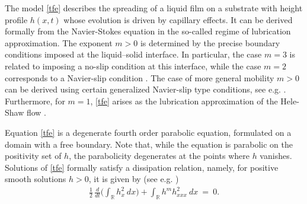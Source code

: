 \documentclass{article}%
\newcommand{\R}{\mathbb{R}}
\newcommand{\ddt}{\, \frac{d}{dt}}
\begin{document}
The model \eqref{tfe} describes the spreading of a liquid film on a substrate with height profile $h(x,t)$ whose
evolution is driven by capillary effects. It can be derived formally from the Navier-Stokes equation in the so-called
regime of lubrication approximation. The exponent $m > 0$ is determined by the precise boundary conditions imposed at
the liquid--solid interface. In particular, the case $m = 3$ is related to imposing a no-slip condition at this interface, while the case $m=2$ corresponds to a Navier-slip condition \cite{Greenspan-1978,Reynolds-1886}. The
case of more general mobility $m > 0$ can be derived using certain generalized Navier-slip type conditions, see e.g.
\cite{BarrettBloweyGarcke-1998,Bertozzi-1998,GiacomelliShishkov-2005,OronDavisBankoff-1997}. Furthermore, for $m =1$,
\eqref{tfe} arises as the lubrication approximation of the Hele-Shaw flow \cite{ConstantinDupontEtal-1993}.

Equation \eqref{tfe} is a degenerate fourth order parabolic equation, formulated
on a domain with a free boundary. Note that, while the equation is parabolic on
the positivity set of $h$, the parabolicity degenerates at the points where
$h$ vanishes. Solutions of \eqref{tfe} formally satisfy a dissipation
relation, namely, for positive smooth solutions $h > 0$, it is given by
(see e.g. \cite{BernisFriedman-1990})
\begin{align}\label{energy} 
  \frac 12 \ddt \Big(\int_\R h_x^2 \ dx \Big) + \int_{\R} h^m h_{xxx}^2 \ dx \ = \ 0.
\end{align}
 
\end{document}
